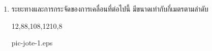 \begin{enumerate}
\item    \begin{ljrp}\runningj 
            ระยะทางและการกระจัดของการเคลื่อนที่ต่อไปนี้ มีขนาดเท่ากับกี่เมตรตามลําดับ 
            \begin{4c}
                {12,8}{8,10}{8,12}{10,8}
            \end{4c}
        \end{ljrp}
        \begin{rp}{pic-jote-1.eps}\end{rp}
\end{enumerate}
